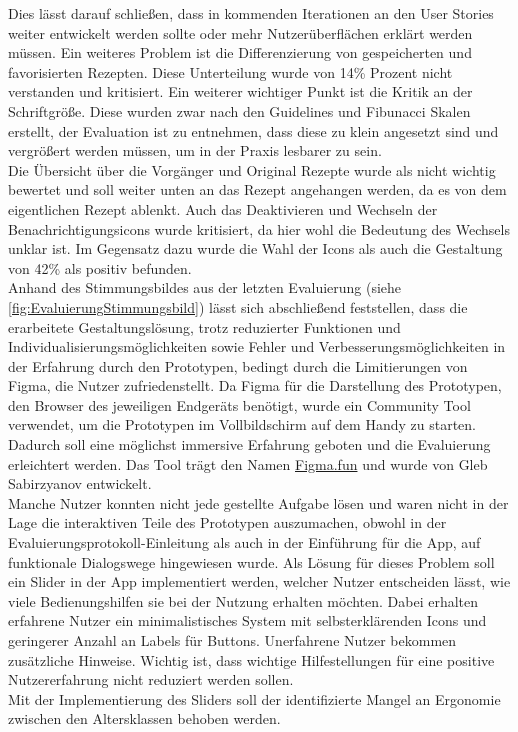 Dies lässt darauf schließen, dass in kommenden Iterationen an den User Stories weiter entwickelt werden sollte oder mehr Nutzerüberflächen erklärt werden müssen. Ein weiteres Problem ist die Differenzierung von gespeicherten und favorisierten Rezepten. Diese Unterteilung wurde von 14\% Prozent nicht verstanden und kritisiert. Ein weiterer wichtiger Punkt ist die Kritik an der Schriftgröße. Diese wurden zwar nach den Guidelines und Fibunacci Skalen erstellt, der Evaluation ist  zu entnehmen, dass diese zu klein angesetzt sind und vergrößert werden müssen, um in der Praxis lesbarer zu sein.\\

Die Übersicht über die Vorgänger und Original Rezepte wurde als nicht wichtig bewertet und soll weiter unten an das Rezept angehangen werden, da es von dem eigentlichen Rezept ablenkt. Auch das Deaktivieren und Wechseln der Benachrichtigungsicons wurde kritisiert, da hier wohl die Bedeutung des Wechsels unklar ist. Im Gegensatz dazu wurde die Wahl der Icons als auch die Gestaltung von 42\% als positiv befunden. \\

Anhand des Stimmungsbildes aus der letzten Evaluierung (siehe \ref{fig:EvaluierungStimmungsbild}) lässt sich abschließend feststellen, dass die erarbeitete Gestaltungslösung, trotz reduzierter Funktionen und Individualisierungsmöglichkeiten sowie Fehler und Verbesserungsmöglichkeiten in der Erfahrung durch den Prototypen, bedingt durch die Limitierungen von Figma, die Nutzer zufriedenstellt.
Da Figma für die Darstellung des Prototypen, den Browser des jeweiligen Endgeräts benötigt, wurde ein Community Tool verwendet, um die Prototypen im Vollbildschirm auf dem Handy zu starten. Dadurch soll eine möglichst immersive Erfahrung geboten und die Evaluierung erleichtert werden. Das Tool trägt den Namen \href{https://figma.fun/}{Figma.fun} und wurde von Gleb Sabirzyanov entwickelt.\\

Manche Nutzer konnten nicht jede gestellte Aufgabe lösen und waren nicht in der Lage die interaktiven Teile des Prototypen auszumachen, obwohl in der Evaluierungsprotokoll-Einleitung als auch in der Einführung für die App, auf funktionale Dialogswege hingewiesen wurde. Als Lösung für dieses Problem soll ein Slider in der App implementiert werden, welcher Nutzer entscheiden lässt, wie viele Bedienungshilfen sie bei der Nutzung erhalten möchten. Dabei erhalten erfahrene Nutzer ein minimalistisches System mit selbsterklärenden Icons und geringerer Anzahl an Labels für Buttons. Unerfahrene Nutzer bekommen zusätzliche Hinweise. Wichtig ist, dass wichtige Hilfestellungen für eine positive Nutzererfahrung nicht reduziert werden sollen.\\
Mit der Implementierung des Sliders soll der identifizierte Mangel an Ergonomie zwischen den Altersklassen behoben werden.\\


